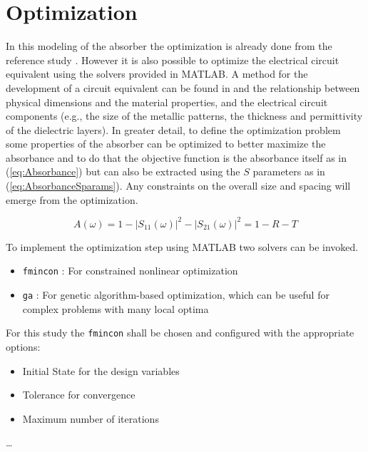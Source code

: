 \section{\textsf{Optimization}}
    In this modeling of the absorber the optimization is already done from the reference
    study \cite{zhang_design_2023}. However it is also possible to optimize the electrical
    circuit equivalent using the solvers provided in MATLAB. A method for the development
    of a circuit equivalent can be found in \cite{jha_design_2018} and the relationship
    between physical dimensions and the material properties, and the electrical circuit
    components (e.g., the size of the metallic patterns, the thickness and permittivity 
    of the dielectric layers). In greater detail, to define the optimization problem some
    properties of the absorber can be optimized to better maximize the absorbance and to
    do that the objective function is the absorbance itself as in (\ref{eq:Absorbance}) but
    can also be extracted using the $S$ parameters as in (\ref{eq:AbsorbanceSparams}). Any
    constraints on the overall size and spacing will emerge from the optimization.

    \begin{equation}
        \label{eq:AbsorbanceSparams}
        A(\omega) = 1 - |S_{11}(\omega)|^2 - |S_{21}(\omega)|^2 = 1 - R - T
    \end{equation}

    To implement the optimization step using MATLAB two solvers can be invoked.
    \begin{itemize}
        \item \texttt{fmincon} : For constrained nonlinear optimization
        \item \texttt{ga} : For genetic algorithm-based optimization, which can be useful 
            for complex problems with many local optima
    \end{itemize}

    For this study the \texttt{fmincon} shall be chosen and configured with the appropriate
    options:
    \begin{itemize}
        \item Initial State for the design variables
        \item Tolerance for convergence
        \item Maximum number of iterations
    \end{itemize}

    \dots
    

